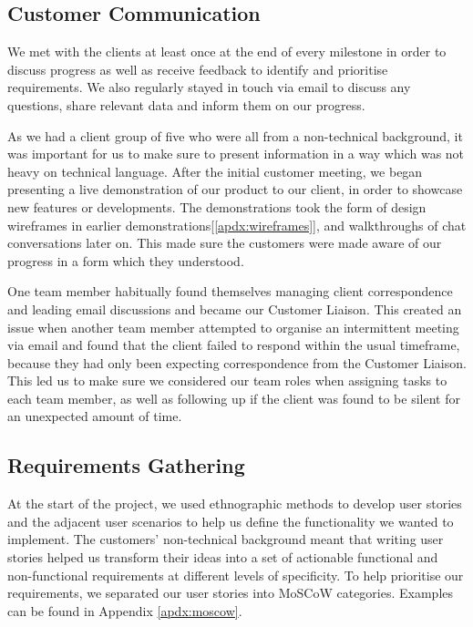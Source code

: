 \documentclass{l3proj}
\begin{document}
\subsection{Customer Communication}
\label{subsec:customer_com}

We met with the clients at least once at the end of every milestone in order to discuss progress as well as receive feedback to identify and prioritise requirements. We also regularly stayed in touch via email to discuss any questions, share relevant data and inform them on our progress.

As we had a client group of five who were all from a non-technical background, it was important for us to make sure to present information in a way which was not heavy on technical language. After the initial customer meeting, we began presenting a live demonstration of our product to our client, in order to showcase new features or developments. The demonstrations took the form of design wireframes in earlier demonstrations[\ref{apdx:wireframes}], and walkthroughs of chat conversations later on. This made sure the customers were made aware of our progress in a form which they understood.

One team member habitually found themselves managing client correspondence and leading email discussions and became our Customer Liaison. This created an issue when another team member attempted to organise an intermittent meeting via email and found that the client failed to respond within the usual timeframe, because they had only been expecting correspondence from the Customer Liaison. This led us to make sure we considered our team roles when assigning tasks to each team member, as well as following up if the client was found to be silent for an unexpected amount of time.

\subsection{Requirements Gathering}
\label{subsec:get_reqs}

At the start of the project, we used ethnographic methods to develop user stories and the adjacent user scenarios to help us define the functionality we wanted to implement. The customers' non-technical background meant that writing user stories  helped us transform their ideas into a set of actionable functional and non-functional requirements at different levels of specificity\cite{userstories:mgs}. To help prioritise our requirements, we separated our user stories into MoSCoW categories. Examples can be found in Appendix \ref{apdx:moscow}.
\end{document}
